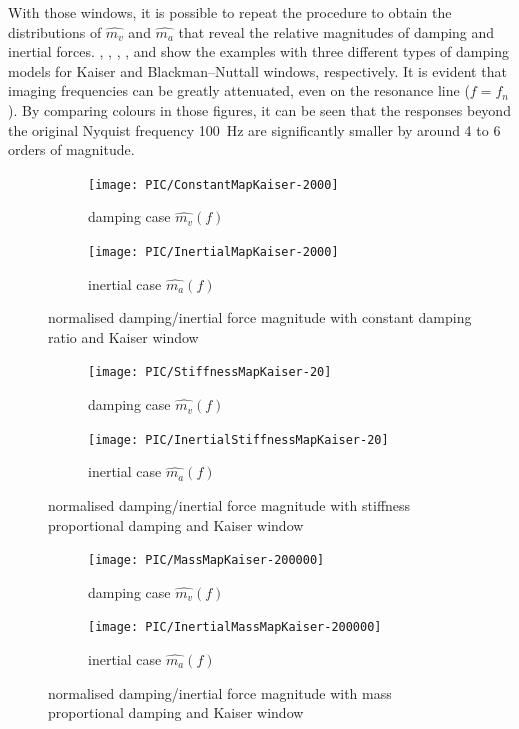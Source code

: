 With those windows, it is possible to repeat the procedure to obtain the distributions of $\hat{m_v}$ and $\hat{m_a}$ that reveal the relative magnitudes of damping and inertial forces. , , , ,  and  show the examples with three different types of damping models for Kaiser and Blackman--Nuttall windows, respectively. It is evident that imaging frequencies can be greatly attenuated, even on the resonance line ($f=f_n$). By comparing colours in those figures, it can be seen that the responses beyond the original Nyquist frequency \SI{100}{\hertz} are significantly smaller by around 4 to 6 orders of magnitude.
\begin{figure}[htb!]
\centering
\begin{subfigure}{.48\textwidth}
\texttt{[image: PIC/ConstantMapKaiser-2000]}
\caption{damping case $\hat{m_v}\left(f\right)$}
\end{subfigure}
\begin{subfigure}{.48\textwidth}
\texttt{[image: PIC/InertialMapKaiser-2000]}
\caption{inertial case $\hat{m_a}\left(f\right)$}
\end{subfigure}
\caption{normalised damping/inertial force magnitude with constant damping ratio and Kaiser window}\label{fig:map_constant_kaiser}
\end{figure}
\begin{figure}[htb!]
\centering
\begin{subfigure}{.48\textwidth}
\texttt{[image: PIC/StiffnessMapKaiser-20]}
\caption{damping case $\hat{m_v}\left(f\right)$}
\end{subfigure}
\begin{subfigure}{.48\textwidth}
\texttt{[image: PIC/InertialStiffnessMapKaiser-20]}
\caption{inertial case $\hat{m_a}\left(f\right)$}
\end{subfigure}
\caption{normalised damping/inertial force magnitude with stiffness proportional damping and Kaiser window}\label{fig:map_stiffness_kaiser}
\end{figure}
\begin{figure}[htb!]
\centering
\begin{subfigure}{.48\textwidth}
\texttt{[image: PIC/MassMapKaiser-200000]}
\caption{damping case $\hat{m_v}\left(f\right)$}
\end{subfigure}
\begin{subfigure}{.48\textwidth}
\texttt{[image: PIC/InertialMassMapKaiser-200000]}
\caption{inertial case $\hat{m_a}\left(f\right)$}
\end{subfigure}
\caption{normalised damping/inertial force magnitude with mass proportional damping and Kaiser window}\label{fig:map_mass_kaiser}
\end{figure}
